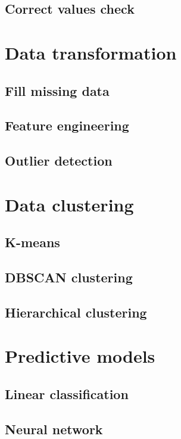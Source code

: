 \documentclass[a4paper, twoside,openright]{report}
\begin{document}
\subsection{Correct values check}

\section{Data transformation}

\subsection{Fill missing data}

\subsection{Feature engineering}

\subsection{Outlier detection}

\section{Data clustering}

\subsection{K-means}

\subsection{DBSCAN clustering}

\subsection{Hierarchical clustering}

\section{Predictive models}

\subsection{Linear classification}

\subsection{Neural network}
\end{document}
